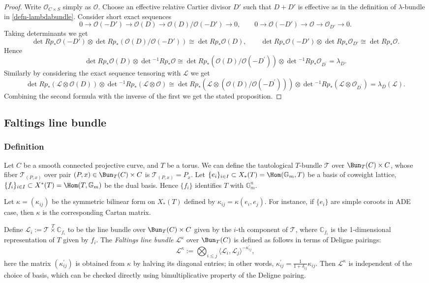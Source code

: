 \documentclass{amsart}
\numberwithin{equation}{section}
\numberwithin{figure}{section}
\theoremstyle{definition}
\theoremstyle{remark}
\renewcommand{\c}[1]{\mathcal{#1}}
\renewcommand{\b}[1]{\mathbb{#1}}
\begin{document}
\begin{proof}
	Write  $\c O_{C\times S}$ simply as $\c O$. Choose an effective relative Cartier divisor $D'$ such that $D+D'$ is effective as in the definition of $\lambda$-bundle in \ref{defn-lambdabundle}. 
	Consider short exact sequences
	\[
	0\to\c O(-D')\to\c O(D)\to \c O(D)/\c O(-D')\to0,
	\qquad
	0\to\c O(-D')\to\c O\to \c O_{D'}\to0.
	\]
	Taking determinants we get
	$$\det Rp_* \c O(-D')\otimes\det Rp_*\left(\c O(D)/\c O(-D') \right) \cong \det Rp_*\c O(D),\qquad
	\det Rp_*\c O(-D')\otimes \det Rp_*\c O_{D'}\cong \det Rp_*\c O.$$
	Hence $$\det Rp_*\c O(D)\otimes \det\!^{-1} Rp_*\c O\cong \det Rp_* (\c O(D)/\c O(-D^\prime))\otimes\det\!^{-1}Rp_*\c O_{D^\prime}=\lambda_{D}  .$$
	Similarly by considering the exact sequence tensoring with $\c L$
	we get $$\det Rp_*(\c L\otimes\c O(D))\otimes \det\!^{-1} Rp_*(\c L\otimes\c O)\cong \det Rp_* (\c L\otimes\left(\c O(D)/\c O(-D^\prime) \right) )\otimes\det\!^{-1}Rp_*(\c L\otimes\c O_{D^\prime})=\lambda_{D}(\c L) .$$
	Combining the second formula with the inverse of the first we get the stated proposition.
\end{proof}


\subsection{Faltings line bundle \cite{faltings2003algebraic}}
\subsubsection{Definition}
Let $C$ be a smooth connected projective curve, and $T$ be a torus. We can define the tautological $T$-bundle $\c T$ over $\Bun_T(C)\times C$, whose fiber $\c T_{(P,x)}$ over pair $(P,x)\in \Bun_T(C)\times C$ is $\c T_{(P,x)}=P_x$. 
Let $\{e_i\}_{i\in I}\subset X_*(T)=\Hom(\b{G}_m,T)$ be a basis of coweight lattice, $\{f_i\}_{i\in I}\subset X^*(T)=\Hom(T,\b{G}_m)$ be the dual basis. Hence $\{f_i\}$ identifies $T$ with $\b G_m^n$.

Let $\kappa=(\kappa_{ij})$ be the symmetric bilinear form on $X_*(T)$ defined by $\kappa_{ij}=\kappa(e_i, e_j)$. For instance, if $\{e_i\}$ are simple coroots in ADE case, then $\kappa$ is the corresponding Cartan matrix.

Define $\c{L}_i:=\c T\stackrel{T}{\times}\b C_{f_i}$ to be the line bundle over $\Bun_T(C)\times C$ given by the $i$-th component of $\c T$, where $\b C_{f_i}$ is the 1-dimensional representation of $T$ given by $f_i$.
The \textit{Faltings line bundle} $\c{L}^\kappa$ over $\Bun_T(C)$ is defined as follows in terms of Deligne pairings: 
\[
\mathcal{L}^\kappa:=\bigotimes_{i\le j}\langle \mathcal{L}_i,\mathcal{L}_j\rangle^{-\kappa_{ij}^\prime},
\]
here the matrix $(\kappa^\prime_{ij})$ is obtained from $\kappa$ by halving its diagonal entries; in other words, $\kappa_{ij}^\prime=\frac{1}{1+\delta_{ij}}\kappa_{ij}$. Then $\c L^\kappa$ is independent of the choice of basis, which can be checked directly using bimultiplicative property of the Deligne pairing.
\end{document}
